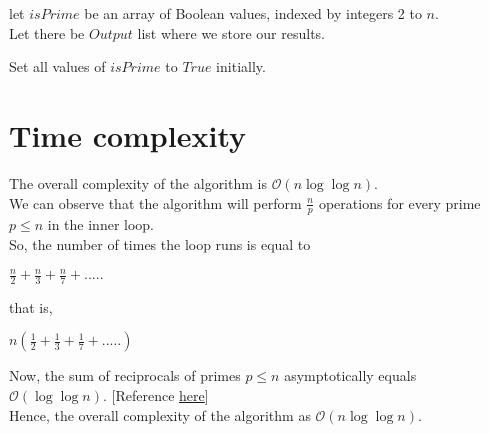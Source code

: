 \documentclass[11pt]{article}
\begin{document}
\begin{tcolorbox}
    \begin{adjustwidth}
        let $isPrime$ be an array of Boolean values, indexed by integers 2 to $n$.\\
        Let there be $Output$ list where we store our results.\\
    \end{adjustwidth}
    Set all values of $isPrime$ to $True$ initially.\\
    
    {
        {
             
        }
   
    
    }
\end{tcolorbox}






\section{Time complexity}
The overall complexity of the algorithm is $\mathcal{O}(n\log\log n)$.\\
We can observe that the algorithm will perform $\frac{n}{p}$ operations for every prime $p \leq n$ in the inner loop.\\
So, the number of times the loop runs is equal to
\begin{center}
    $\frac{n}{2} + \frac{n}{3}+ \frac{n}{7} + ..... $
\end{center}
that is, 

\begin{center}
    $n(\frac{1}{2} + \frac{1}{3}+ \frac{1}{7} + ..... )$
\end{center}
Now, the sum of reciprocals of primes $p \leq n$ asymptotically equals $\mathcal{O}(\log\log n)$. [Reference \textcolor{blue}{\href{https://math.stackexchange.com/a/674909}{here}}]\\
Hence, the overall complexity of the algorithm as $\mathcal{O}(n\log\log n)$.
\end{document}
